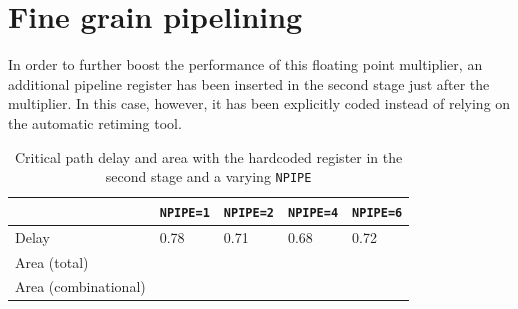 \section{Fine grain pipelining}
In order to further boost the performance of this floating point multiplier, an additional pipeline register has been inserted in the second stage just after the multiplier. In this case, however, it has been explicitly coded instead of relying on the automatic retiming tool.
\begin{table}

	\begin{tabular}{|l|l|l|l|l|}
	\hline
	&\texttt{NPIPE=1} & \texttt{NPIPE=2} & \texttt{NPIPE=4} & \texttt{NPIPE=6}\\\hline
	Delay & 0.78 & 0.71 & 0.68 & 0.72 \\\hline
	Area (total) & & & & \\\hline
	Area (combinational) & & & & \\\hline
	\end{tabular}

	\caption{Critical path delay and area with the hardcoded register in the second stage and a varying \texttt{NPIPE}}
	\label{tab:stage2}
\end{table}

